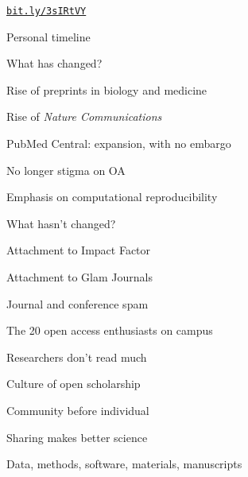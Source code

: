 \documentclass[aspectratio=169,12pt,t]{beamer}
\begin{document}
\begin{frame}[c]{}
  \vspace{8pt}

  \centerline{}

  \vfill
  \hfill
  \href{https://bit.ly/3sIRtVY}{\tt \footnotesize \lolit bit.ly/3sIRtVY}

\end{frame}


\begin{frame}[c]{Personal timeline}


  \note{
  }
\end{frame}


\begin{frame}{What has changed?}

  \bbi
\item Rise of preprints in biology and medicine
\item Rise of \emph{Nature Communications}
\item PubMed Central: expansion, with no embargo
\item No longer stigma on OA
\item Emphasis on computational reproducibility
  \ei

  \note{
  }
\end{frame}


\begin{frame}{What hasn't changed?}

  \bbi
\item Attachment to Impact Factor
\item Attachment to Glam Journals
\item Journal and conference spam
\item The 20 open access enthusiasts on campus
\item Researchers don't read much
  \ei

\end{frame}


\begin{frame}{Culture of open scholarship}

  \bbi
\item Community before individual
\item Sharing makes better science
  \bi
\item Data, methods, software, materials, manuscripts
  \ei
  \ei

  \note{
  }
\end{frame}
\end{document}
